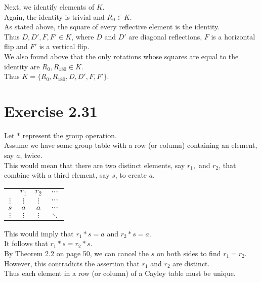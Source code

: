 \documentclass{article}
\begin{document}
Next, we identify elements of \(K\). \\
Again, the identity is trivial and \(R_0\in K\). \\
As stated above, the square of every reflective element is the identity. \\
Thus \(D, D', F, F'\in K\), where \(D\) and \(D'\) are diagonal reflections, \(F\) is a horizontal flip and \(F'\) is a vertical flip. \\
We also found above that the only rotations whose squares are equal to the identity are \(R_0, R_{180}\in K\). \\
Thus \(K=\{R_0, R_{180}, D, D', F, F'\}\).

\section*{Exercise 2.31}
Let \(*\) represent the group operation. \\
Assume we have some group table with a row (or column) containing an element, say \(a\), twice. \\
This would mean that there are two distinct elements, say \(r_1,\) and \(r_2\), that combine with a third element, say \(s\), to create \(a\).
\begin{center}
    \begin{tabular}{c | c c c }
          & \(r_1\) & \(r_2\) & \(\cdots\) \\
        \cline{1-4}
        \(\vdots\) & \(\vdots\) & \(\vdots\) &\(\cdots\) \\
        \(s\) & \(a\) & \(a\) & \(\cdots\) \\
        \(\vdots\) & \(\vdots\) & \(\vdots\) &\(\ddots\)
    \end{tabular}
\end{center}
This would imply that \(r_1 * s = a\) and \(r_2 * s = a\). \\
It follows that \(r_1*s=r_2*s\). \\
By Theorem 2.2 on page 50, we can cancel the \(s\) on both sides to find \(r_1=r_2\). \\
However, this contradicts the assertion that \(r_1\) and \(r_2\) are distinct. \\
Thus each element in a row (or column) of a Cayley table must be unique.
\end{document}
